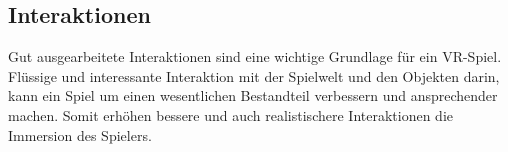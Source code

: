\subsection{Interaktionen}
Gut ausgearbeitete Interaktionen sind eine wichtige Grundlage für ein VR-Spiel. Flüssige und interessante Interaktion mit der Spielwelt und den Objekten darin, kann ein Spiel um einen wesentlichen Bestandteil verbessern und ansprechender machen. Somit erhöhen bessere und auch realistischere Interaktionen die Immersion des Spielers.